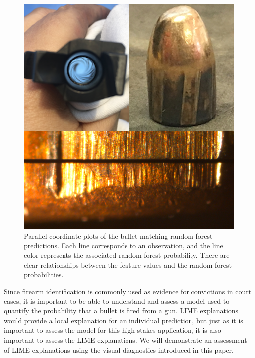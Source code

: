 \documentclass[AMS,STIX2COL]{WileyNJD-v2}\usepackage[]{graphicx}\usepackage[]{color}
\newenvironment{knitrout}{}{} %
\begin{document}
\begin{figure}[!thp]
\begin{knitrout}
\color{fgcolor}

{\centering \includegraphics[width=6.5in]{figure-static/figure-08-1} 

}



\end{knitrout}
\caption{Parallel coordinate plots of the bullet matching  random forest predictions.  Each line corresponds to an observation, and the line color represents the associated random forest probability. There are clear relationships between the feature values and the random forest probabilities.}
\label{fig:figure-08}
\end{figure}

Since firearm identification is commonly used as evidence for convictions in court cases, it is important to be able to understand and assess a model used to quantify the probability that a bullet is fired from a gun. LIME explanations would provide a local explanation for an individual prediction, but just as it is important to assess the model for this high-stakes application, it is also important to assess the LIME explanations. We will demonstrate an assessment of LIME explanations using the visual diagnostics introduced in this paper.
\end{document}
